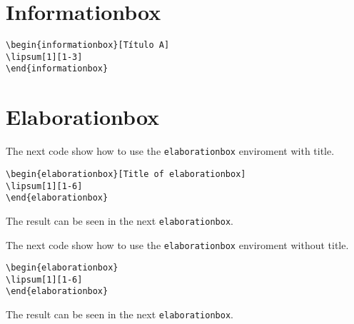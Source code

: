 
\section{Informationbox}

\lipsum[1][1-3]
\begin{highlightbox}
\begin{verbatim}
\begin{informationbox}[Título A]
\lipsum[1][1-3]
\end{informationbox}
\end{verbatim}
\end{highlightbox}
\begin{informationbox}[Título A]
\lipsum[1][1-3]
\end{informationbox}


\section{Elaborationbox}

The next code show how to use the \texttt{elaborationbox} enviroment with title.
\begin{highlightbox}
\begin{verbatim}
\begin{elaborationbox}[Title of elaborationbox]
\lipsum[1][1-6]
\end{elaborationbox}
\end{verbatim}
\end{highlightbox}
The result can be seen in the next \texttt{elaborationbox}.
\begin{elaborationbox}
\lipsum[1][1-6]
\end{elaborationbox}

The next code show how to use the \texttt{elaborationbox} enviroment without title.
\begin{highlightbox}
\begin{verbatim}
\begin{elaborationbox}
\lipsum[1][1-6]
\end{elaborationbox}
\end{verbatim}
\end{highlightbox}
The result can be seen in the next \texttt{elaborationbox}.
\begin{elaborationbox}
\lipsum[1][1-6]
\end{elaborationbox}


